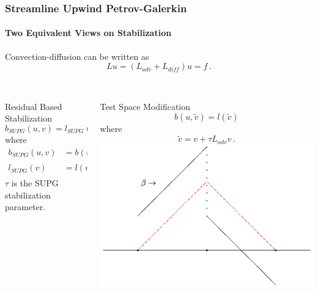 \documentclass[18pt,xcolor=table]{beamer}
\begin{document}
\begin{frame}[t]
\frametitle{Streamline Upwind Petrov-Galerkin}
\framesubtitle{Two Equivalent Views on Stabilization}
Convection-diffusion can be written as
$$
Lu=(L_{adv}+L_{diff})u=f\,.
$$\\
\vspace{-3ex}
\begin{columns}[t]
\begin{column}{.65\textwidth}
\begin{block}{Residual Based Stabilization}
\[
b_{SUPG}(u,v)=l_{SUPG}(v)
\]
where
\begin{align*}
  b_{SUPG}(u,v)&=b(u,v)
  +\sum_K\int_K\tau(L_{adv}v)(Lu-f)\\
  l_{SUPG}(v)&=l(v)+\sum_K\int_K\tau(L_{adv}v)f\,,
\end{align*}
$\tau$ is the SUPG stabilization parameter.
\end{block}
\end{column}
\begin{column}{.33\textwidth}
\begin{block}{Test Space Modification}
\[
b(u,\tilde v)=l(\tilde v)
\]
where
\[
\tilde v = v+\tau L_{adv}v\,.
\]
\includegraphics[width=1.0\textwidth]{Motivation/SUPGtest.png}
\end{block}
\end{column}
\end{columns}
\medskip
\end{frame}
\end{document}

